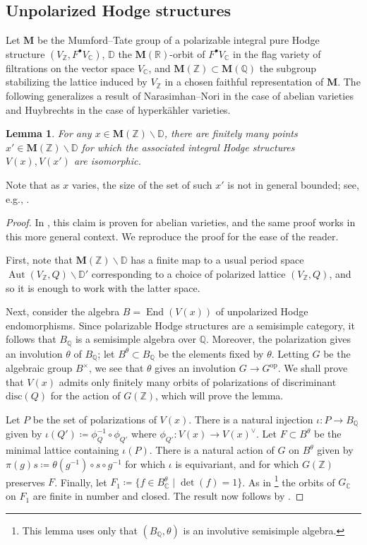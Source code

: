 \documentclass{amsart}
\newcommand{\End}{\operatorname{End}}
\newcommand{\bs}{\backslash}
\newcommand{\op}{\operatorname{op}}
\newtheorem{lem}[theorem]{Lemma}
\theoremstyle{definition}
\theoremstyle{remark}
\def\bD{\mathbb{D}}
\def\bZ{\mathbb{Z}}
\def\bQ{\mathbb{Q}}
\def\bR{\mathbb{R}}
\def\bC{\mathbb{C}}
\newcommand\bfM{{\bf M}}
\def\Aut{\operatorname{Aut}}
\def\End{\operatorname{End}}
\def\bfM{\mathbf{M}}
\numberwithin{equation}{section}
\begin{document}




\subsection{Unpolarized Hodge structures}\label{subsect:unpol orbits}


Let $\bfM$ be the Mumford--Tate group of a polarizable integral pure Hodge structure $(V_\bZ,F^\bullet V_\bC)$, $\bD$ the $\bfM(\bR)$-orbit of $F^\bullet V_\bC$ in the flag variety of filtrations on the vector space $V_\bC$, and $\bfM(\bZ)\subset \bfM(\bQ)$ the subgroup stabilizing the lattice induced by $V_\bZ$ in a chosen faithful representation of $\bfM$.
The following generalizes a result of Narasimhan--Nori \cite{Na81} in the case of abelian varieties and Huybrechts \cite[Cor 1.8]{Hu18} in the case of hyperk\"ahler varieties.
    \begin{lem}\label{lem:unpol orbit}For any $x\in \bfM(\bZ)\backslash \bD$, there are finitely many points $x'\in \bfM(\bZ)\backslash \bD$ for which the associated integral Hodge structures $V(x),V(x')$ are isomorphic.
\end{lem}

Note that as $x$ varies, the size of the set of such $x'$ is not in general bounded; see, e.g., \cite[\S 1.5]{Hu18}.
\begin{proof} In \cite{Na81}, this claim is proven for abelian varieties, and the same proof works in this more general context. We reproduce the proof for the ease of the reader.

First, note that $\bfM(\bZ)\bs\bD$ has a finite map to a usual period space $\Aut(V_\bZ,Q)\bs\bD'$ corresponding to a choice of polarized lattice $(V_\bZ,Q)$, and so it is enough to work with the latter space. 


Next, consider the algebra $B=\End(V(x))$ of unpolarized Hodge endomorphisms. Since polarizable Hodge structures are a semisimple category, it follows that $B_{\bQ}$ is a semisimple algebra over $\bQ$. Moreover, the polarization gives an involution $\theta$ of $B_\bQ$; let $ B^{\theta}\subset B_\bQ$ be the elements fixed by $\theta$. Letting $G$ be the algebraic group $B^{\times}$, we see that $\theta$ gives an involution $G\to G^{\op}$. We shall prove that $V(x)$ admits only finitely many orbits of polarizations of discriminant $\mathrm{disc}(Q)$ for the action of $G(\bZ)$, which will prove the lemma.

Let $P$ be the set of polarizations of $V(x)$. There is a natural injection $\iota:P\to B_\bQ$
given by $\iota(Q')\coloneqq  \phi^{-1}_Q\circ \phi_{Q'}$ where $\phi_{Q'}:V(x)\to V(x)^{\vee}$. Let $F\subset B^{\theta}$ be the minimal lattice containing $\iota(P)$. There is a natural action of $G$ on $B^{\theta}$ given by $\pi(g)s\coloneqq  \theta(g^{-1})\circ s\circ g^{-1}$ for which $\iota$ is equivariant, and for which $G(\bZ)$ preserves $F$. Finally, let $F_1\coloneqq  \{f\in B^{\theta}_{\bC}\mid \det(f)=1\}$. As in \cite[Lemma 3.1]{Na81}\footnote{This lemma uses only that $(B_\bQ,\theta)$ is an involutive semisimple algebra.} the orbits of $G_\bC$ on $F_1$ are finite in number and closed. The result now follows by \cite[Thm 6.9]{BHC62}.
\end{proof}
\end{document}
